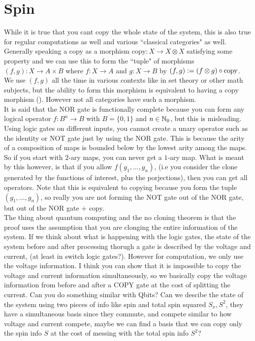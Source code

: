 \documentclass{book}
\begin{document}
	\chapter{Spin}
	 While it is true that you cant copy the whole state of the system, this is also true for regular computations as well and various ``classical categories" as well. Generally speaking a copy as a morphism $\text{copy}: X \rightarrow X \otimes X$ satisfying some property and we can use this to form the ``tuple" of morphisms $(f,g): X \rightarrow A \times B$ where $f:X \rightarrow A$ and $g:X \rightarrow B$ by $(f,g) \vcentcolon= (f \otimes g) \circ \text{copy}$. We use $(f,g)$ all the time in various contexts like in set theory or other math subjects, but the ability to form this morphism is equivalent to having a $\text{copy}$ morphism (). However not all categories have such a morphism.   \\
	
	It is said that the NOR gate is functionally complete because you can form any logical operator $f:B^n \rightarrow B$ with $B=\{0,1\}$ and $n \in \mathbb{N}_0$, but this is misleading. Using logic gates on different inputs, you cannot create a unary operator such as the identity or NOT gate just by using the NOR gate. This is because the arity of a composition of maps is bounded below by the lowest arity among the maps. So if you start with $2$-ary maps, you can never get a $1$-ary map. What is meant by this however, is that if you allow $f(g_1, \ldots, g_n)$, (i.e you consider the clone generated by the functions of interest, plus the porjections), then you can get all operators. Note that this is equivalent to copying because you form the tuple $(g_1, \ldots, g_n)$, so really you are not forming the NOT gate out of the NOR gate, but out of the NOR gate $+$ copy. \\
	
	 The thing about quantum computing and the no cloning theorem is that the proof uses the assumption that you are clonging the entire information of the system. If we think about what is happening with the logic gates, the state of the system before and after processing thorugh a gate is described by the voltage and current, (at least in switch logic gates?). However for computation, we only use the voltage information. I think you can show that it is impossible to copy the voltage and current information simultaneously, so we basically copy the voltage information from before and after a COPY gate at the cost of splitting the current. Can you do something similar with Qbits? Can we descibe the state of the system using two pieces of info like spin and total spin squared $S_x, S^2$, they have a simultaneous basis since they commute, and compete similar to how voltage and current compete, maybe we can find a basis that we can copy only the spin info $S$ at the cost of messing with the total spin info $S^2$?
	
\end{document}
